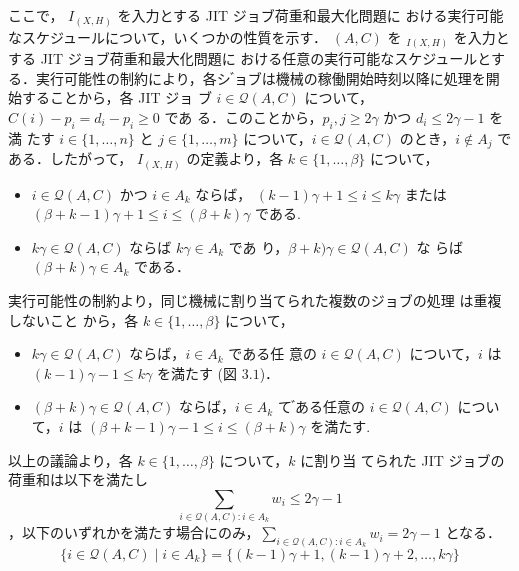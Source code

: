 \documentclass[12pt]{optlab-bachelor}
\begin{document}
ここで， $I_{(X,H)}$ を入力とする JIT ジョブ荷重和最大化問題に
おける実行可能なスケジュールについて，いくつかの性質を示す．
$(A, C)$ を $_{I(X,H)}$ を入力とする JIT ジョブ荷重和最大化問題に
おける任意の実行可能なスケジュールとする．実行可能性の制約により，各シ
゙ョブは機械の稼働開始時刻以降に処理を開始することから，各 JIT ジョ
ブ $i \in \mathcal{Q}(A,C)$ について，$C(i) − p_i = d_i − p_i \ge 0$ であ
る．このことから，$p_i,j \ge 2\gamma$ かつ $d_i \le 2\gamma − 1$ を満
たす $i \in \{1,\ldots,n\}$ と $j \in \{1,\ldots,m\}$ について，$i \in
\mathcal{Q}(A,C)$ のとき，$i \notin A_j$ である．したがって，
$I_{(X,H)}$ の定義より，各 $k \in \{1,\ldots,\beta\}$ について，
\begin{itemize}
  \item $i \in \mathcal{Q}(A,C)$ かつ $i \in A_k$ ならば，
  $(k − 1)\gamma + 1 \le i \le k\gamma$ または $(\beta + k − 1)\gamma +
  1 \le i \le (\beta + k)\gamma$ である.
  \item $k\gamma \in \mathcal{Q}(A,C)$ ならば $k\gamma \in A_k$ であ
  り，$\beta + k)\gamma \in \mathcal{Q}(A,C)$ な
  らば $(\beta + k)\gamma \in A_k$ である．
\end{itemize}
実行可能性の制約より，同じ機械に割り当てられた複数のジョブの処理
は重複しないこと から，各 $k \in \{1,\ldots,\beta\}$ について，
\begin{itemize}
  \item $k\gamma \in \mathcal{Q}(A,C)$ ならば，$i \in A_k$ である任
  意の $i \in \mathcal{Q}(A,C)$ について，$i$ は \\$(k − 1)\gamma− 1
  \le k\gamma$ を満たす (図 $3.1$)．
  \item $(\beta + k)\gamma \in \mathcal{Q}(A,C)$ ならば，$i \in A_k$ て
  ゙ある任意の $i \in \mathcal{Q}(A,C)$ について，$i$ は
  $(\beta + k − 1)\gamma − 1 \le i \le (\beta + k)\gamma$ を満たす.
\end{itemize}
以上の議論より，各 $k \in \{1,\ldots, \beta \}$ について，$k$ に割り当
てられた JIT ジョブの荷重和は以下を満たし
\begin{equation}
  \sum_{i \in \mathcal{Q}(A,C):i \in A_k}w_i \le
  2\gamma - 1 \tag{A.1}
\end{equation}
，以下のいずれかを満たす場合にのみ，$\displaystyle \sum_{i \in \mathcal{Q}(A,C):i \in A_k}w_i = 2\gamma - 1$ となる．
\begin{equation}
  \{i \in \mathcal{Q}(A,C) \mid i \in A_k\} = \{(k - 1)\gamma + 1, (k
  - 1)\gamma + 2,\ldots,k\gamma\} \tag{A.2}
\end{equation}
\end{document}
